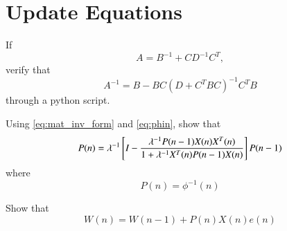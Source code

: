 \documentclass[journal,12pt,twocolumn]{IEEEtran}
\begin{document}
\section{Update Equations}
\begin{problem}
If
\begin{equation}
A=B^{-1}+CD^{-1}C^{T},
\end{equation}
verify that
\begin{equation}
\label{eq:mat_inv_form}
A^{-1}=B-BC(D+C^{T}BC)^{-1}C^{T}B
\end{equation}
%
through a python script.  
\end{problem}
%
\begin{problem}
Using \eqref{eq:mat_inv_form} and \eqref{eq:phin}, show that
%
\begin{equation}
\label{eq:pn}
P(n)=\lambda ^{-1}{}\left[I -   \dfrac{\lambda ^{-1}P(n-1)X(n)X^{T}(n)}{1+ \lambda ^{-1}X^{T}(n)P(n-1)X(n)}\right]P(n-1)
\end{equation}
where 
\begin{equation}
P(n)=\phi ^{-1} (n)
\end{equation} 
\end{problem}
%
%
\begin{problem}
Show that
\begin{equation}
W(n)= W(n-1)+P(n)X(n)e(n)
\end{equation}
\end{problem}
\end{document}
